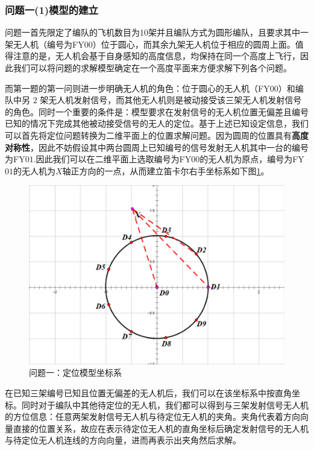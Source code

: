 \documentclass[withoutpreface,bwprint]{cumcmthesis} %
\begin{document}
			\subsubsection{问题一(1)模型的建立}
			\par 问题一首先限定了编队的飞机数目为10架并且编队方式为圆形编队，且要求其中一架无人机（编号为FY$ 00 $）位于圆心，而其余九架无人机位于相应的圆周上面。值得注意的是，无人机会基于自身感知的高度信息，均保持在同一个高度上飞行，因此我们可以将问题的求解模型确定在一个高度平面来方便求解下列各个问题。
			\par 
			而第一题的第一问则进一步明确无人机的角色：位于圆心的无人机（FY$ 00 $）和编队中另 $ 2 $ 架无人机发射信号，而其他无人机则是被动接受该三架无人机发射信号的角色。同时一个重要的条件是：模型要求在发射信号的无人机位置无偏差且编号已知的情况下完成其他被动接受信号的无人的定位。基于上述已知设定信息，我们可以首先将定位问题转换为二维平面上的位置求解问题。因为圆周的位置具有\textbf{高度对称性}，因此不妨假设其中两台圆周上已知编号的信号发射无人机其中一台的编号为FY$ 01 $.因此我们可以在二维平面上选取编号为FY$ 00 $的无人机为原点，编号为FY$ 01 $的无人机为$ X $轴正方向的一点，从而建立笛卡尔右手坐标系如下图\ref{1-1}。
			\begin{figure}[htb]
				\centering
				\includegraphics[width=0.7\linewidth]{./figures/Question1-1.png}
				\caption{问题一：定位模型坐标系}
				\label{1-1}
			\end{figure}
			在已知三架编号已知且位置无偏差的无人机后，我们可以在该坐标系中按直角坐标。同时对于编队中其他待定位的无人机，我们都可以得到与三架发射信号无人机的方位信息：任意两架发射信号无人机与待定位无人机的夹角。夹角代表着方向向量直接的位置关系，故应在表示待定位无人机的直角坐标后确定发射信号的无人机与待定位无人机连线的方向向量，进而再表示出夹角然后求解。
\end{document}

